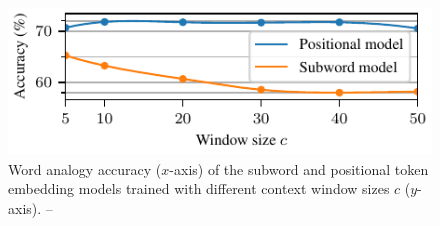\begin{figure}
\vspace*{-0.65cm}
\includegraphics[width=0.55\columnwidth,
                 trim={0 0.5cm 0 0},clip]{window-size-to-accuracy}
\vspace{-0.25cm}
\caption{Word analogy accuracy ($x$-axis) of the subword and positional token
         embedding models trained with different context window sizes $c$ ($y$-axis).
         -- \textcite[Figure 2]{novotny2022when}}
\end{figure}
\vspace{-0.2cm}